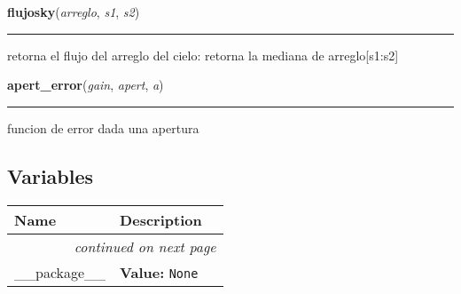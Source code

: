     \label{astrocalc_s:flujosky}

    \vspace{0.5ex}

\hspace{.8\funcindent}\begin{boxedminipage}{\funcwidth}

    \raggedright \textbf{flujosky}(\textit{arreglo}, \textit{s1}, \textit{s2})

    \vspace{-1.5ex}

    \rule{\textwidth}{0.5\fboxrule}
\setlength{\parskip}{2ex}
    retorna el flujo del arreglo del cielo: retorna la mediana de 
    arreglo[s1:s2]

\setlength{\parskip}{1ex}
    \end{boxedminipage}

    \label{astrocalc_s:apert_error}

    \vspace{0.5ex}

\hspace{.8\funcindent}\begin{boxedminipage}{\funcwidth}

    \raggedright \textbf{apert\_error}(\textit{gain}, \textit{apert}, \textit{a})

    \vspace{-1.5ex}

    \rule{\textwidth}{0.5\fboxrule}
\setlength{\parskip}{2ex}
    funcion de error dada una apertura

\setlength{\parskip}{1ex}
    \end{boxedminipage}



  \subsection{Variables}

    \vspace{-1cm}
\hspace{\varindent}\begin{longtable}{|p{\varnamewidth}|p{\vardescrwidth}|l}
\cline{1-2}
\cline{1-2} \centering \textbf{Name} & \centering \textbf{Description}& \\
\cline{1-2}
\endhead\cline{1-2}\multicolumn{3}{r}{\small\textit{continued on next page}}\\\endfoot\cline{1-2}
\endlastfoot\raggedright \_\-\_\-p\-a\-c\-k\-a\-g\-e\-\_\-\_\- & \raggedright \textbf{Value:} 
{\tt None}&\\
\cline{1-2}
\end{longtable}

